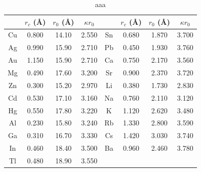 \documentclass[reprint, amsmath, amssymb, aps, prl]{revtex4-2}
\begin{document}
\begin{table}[b]
\caption{\label{tab:table2} aaa}
\begin{ruledtabular}
\begin{tabular}{cccccccc}
 &$r_c$ (\AA)&$r_0$ (\AA)&$\kappa r_0$&
 &$r_c$ (\AA) &$r_0$ (\AA)&$\kappa r_0$\\
\hline
Cu& 0.800 & 14.10 & 2.550 &Sn\footnotemark[1]
& 0.680 & 1.870 & 3.700 \\
Ag& 0.990 & 15.90 & 2.710 &Pb\footnotemark[2]
& 0.450 & 1.930 & 3.760 \\
Au& 1.150 & 15.90 & 2.710 &Ca\footnotemark[3]
& 0.750 & 2.170 & 3.560 \\
Mg& 0.490 & 17.60 & 3.200 &Sr\footnotemark[4]
& 0.900 & 2.370 & 3.720 \\
Zn& 0.300 & 15.20 & 2.970 &Li\footnotemark[2]
& 0.380 & 1.730 & 2.830 \\
Cd& 0.530 & 17.10 & 3.160 &Na\footnotemark[5]
& 0.760 & 2.110 & 3.120 \\
Hg& 0.550 & 17.80 & 3.220 &K\footnotemark[5]
&  1.120 & 2.620 & 3.480 \\
Al& 0.230 & 15.80 & 3.240 &Rb\footnotemark[3]
& 1.330 & 2.800 & 3.590 \\
Ga& 0.310 & 16.70 & 3.330 &Cs\footnotemark[4]
& 1.420 & 3.030 & 3.740 \\
In& 0.460 & 18.40 & 3.500 &Ba\footnotemark[5]
& 0.960 & 2.460 & 3.780 \\
Tl& 0.480 & 18.90 & 3.550 & & & & \\
\end{tabular}
\end{ruledtabular}
\end{table}

\nocite{*}

\end{document}
